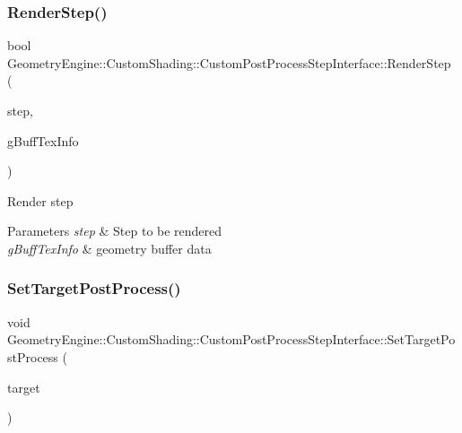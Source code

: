 \subsubsection{\texorpdfstring{RenderStep()}{RenderStep()}}
{\footnotesize\ttfamily bool Geometry\+Engine\+::\+Custom\+Shading\+::\+Custom\+Post\+Process\+Step\+Interface\+::\+Render\+Step (\begin{DoxyParamCaption}\item[{\mbox{\hyperlink{namespace_geometry_engine_1_1_custom_shading_a09e44ca81de5fe08c6d50271d680c4b1}{Custom\+Post\+Process\+Steps}}}]{step,  }\item[{const \mbox{\hyperlink{class_geometry_engine_1_1_g_buffer_texture_info}{G\+Buffer\+Texture\+Info}} \&}]{g\+Buff\+Tex\+Info }\end{DoxyParamCaption})\hspace{0.3cm}{\ttfamily [virtual]}}

Render step 
\begin{DoxyParams}{Parameters}
{\em step} & Step to be rendered \\
\hline
{\em g\+Buff\+Tex\+Info} & geometry buffer data \\
\hline
\end{DoxyParams}
\mbox{\label{class_geometry_engine_1_1_custom_shading_1_1_custom_post_process_step_interface_a122afe43200a8b32100b8dea42010418}} 
\subsubsection{\texorpdfstring{SetTargetPostProcess()}{SetTargetPostProcess()}}
{\footnotesize\ttfamily void Geometry\+Engine\+::\+Custom\+Shading\+::\+Custom\+Post\+Process\+Step\+Interface\+::\+Set\+Target\+Post\+Process (\begin{DoxyParamCaption}\item[{\mbox{\hyperlink{class_geometry_engine_1_1_geometry_post_process_1_1_post_process}{Geometry\+Post\+Process\+::\+Post\+Process}} $\ast$}]{target }\end{DoxyParamCaption})}

